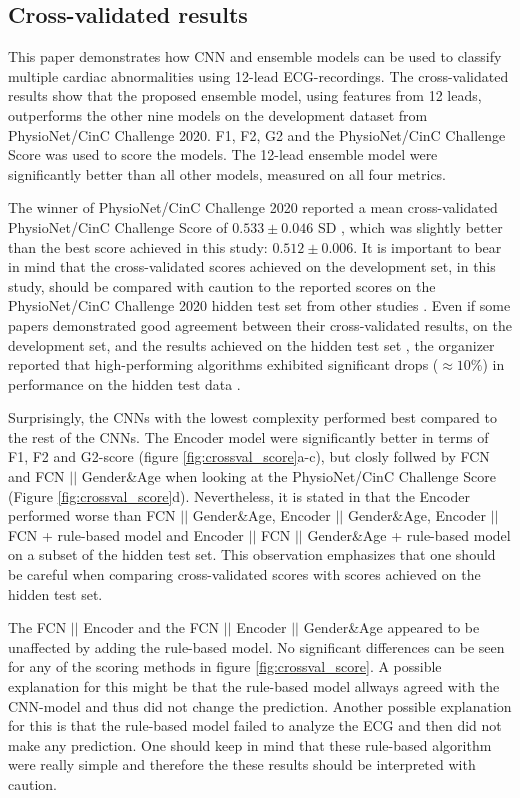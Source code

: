\subsection{Cross-validated results}
This paper demonstrates how CNN and ensemble models can be used to classify multiple cardiac abnormalities using 12-lead ECG-recordings. The cross-validated results show that the proposed ensemble model, using features from 12 leads, outperforms the other nine models on the development dataset from PhysioNet/CinC Challenge 2020. F1, F2, G2 and the PhysioNet/CinC Challenge Score was used to score the models. The 12-lead ensemble model were significantly better than all other models, measured on all four metrics.

The winner of PhysioNet/CinC Challenge 2020 reported a mean  cross-validated PhysioNet/CinC Challenge Score of $0.533\pm0.046$ SD \cite{natarajan_wide_nodate}, which was slightly better than the best score achieved in this study: $0.512\pm 0.006$. It is important to bear in mind that the cross-validated scores achieved on the development set, in this study, should be compared with caution to the reported scores on the PhysioNet/CinC Challenge 2020 hidden test set from other studies \cite{natarajan_wide_nodate,singstad_convolutional_nodate}. Even if some papers demonstrated good agreement between their cross-validated results, on the development set, and the results achieved on the hidden test set \cite{natarajan_wide_nodate}, the organizer reported that high-performing algorithms exhibited significant drops ($\approx 10\%$) in performance on the hidden test data \cite{alday_classification_2020}.

Surprisingly, the CNNs with the lowest complexity performed best compared to the rest of the CNNs. The Encoder model were significantly better in terms of F1, F2 and G2-score (figure \ref{fig:crossval_score}a-c), but closly follwed by FCN and FCN $||$ Gender\&Age when looking at the PhysioNet/CinC Challenge Score (Figure \ref{fig:crossval_score}d). Nevertheless, it is stated in \cite{singstad_convolutional_nodate} that the Encoder performed worse than FCN $||$ Gender\&Age, Encoder $||$ Gender\&Age, Encoder $||$ FCN + rule-based model and Encoder $||$ FCN $||$ Gender\&Age + rule-based model on a subset of the hidden test set. This observation emphasizes that one should be careful when comparing cross-validated scores with scores achieved on the hidden test set.

The FCN $||$ Encoder and the FCN $||$ Encoder $||$ Gender\&Age appeared to be unaffected by adding the rule-based model. No significant differences can be seen for any of the scoring methods in figure \ref{fig:crossval_score}. A possible explanation for this might be that the rule-based model allways agreed with the CNN-model and thus did not change the prediction. Another possible explanation for this is that the rule-based model failed to analyze the ECG and then did not make any prediction. One should keep in mind that these rule-based algorithm were really simple and therefore the these results should be interpreted with caution.

